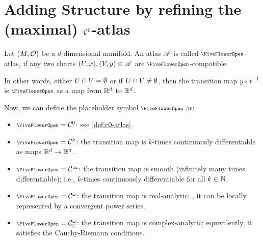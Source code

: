 
\section{Adding Structure by refining the (maximal) \texorpdfstring{\(\mathcal C^0\)}{C0}-atlas}

\begin{definition}
	Let \((M, \mathcal{O})\) be a \(d\)-dimensional manifold. An atlas \(\mathscr{A}\) is called \(\flower\)-atlas, if any two charts \((U, x), (V, y) \in \mathscr{A}\) are \(\flower\)-compatible.
\end{definition}

In other words, either \(U \cap V = \emptyset\) or if \(U \cap V \neq \emptyset\), then the transition map \(y \circ x^{-1}\) is \(\flower\) as a map from \(\mathbb R^d\) to \(\mathbb R^d\).
\begin{figure}[H]
	\centering
\end{figure}

Now, we can define the placeholder symbol \(\flower\) as:
\begin{itemize}
	\item \(\flower = \SC^0\): see \cref{def:c0-atlas}.
	\item \(\flower = \SC^k\): the transition map is \(k\)-times continuously differentiable as maps \(\mathbb R^d \to \mathbb R^d\).
	\item \(\flower = \SC^{\infty}\): the transition map is smooth (infinitely many times differentiable); i.e., \(k\)-times continuously differentiable for all \(k \in \mathbb N\).
	\item \(\flower = \SC^{\omega}\): the transition map is real-analytic; \ie, it can be locally represented by a convergent power series.
	\item \(\flower = \SC^{\omega}_{\C}\): the transition map is complex-analytic; equivalently, it satisfies the Cauchy-Riemann conditions.
\end{itemize}

